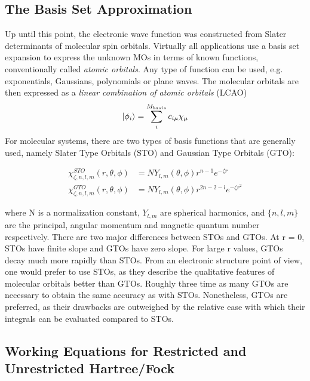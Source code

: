 \subsection{The Basis Set Approximation}

Up until this point, the electronic wave function was constructed from Slater determinants of molecular spin orbitals. Virtually all applications use a basis set expansion to express the unknown MOs in terms of known functions, conventionally called \emph{atomic orbitals}. Any type of function can be used, e.g. exponentials, Gaussians, polynomials or plane waves. The molecular orbitals are then expressed as a \emph{linear combination of atomic orbitals} (LCAO)
\begin{equation}
\ket{\phi_i} = \sum_i^{M_{basis}} c_{i\mu} \chi_{\mu} 
\end{equation}
\noindent For molecular systems, there are two types of basis functions that are generally used, namely Slater Type Orbitals (STO) and Gaussian Type Orbitals (GTO):

\begin{align}
\chi_{\zeta, n, l, m}^{STO} (r,\theta ,\phi ) &= N Y_{l,m} (\theta , \phi ) r^{n-1} e^{-\zeta r}
\\
\chi_{\zeta, n, l, m}^{GTO} (r,\theta ,\phi ) &= N Y_{l,m} (\theta , \phi ) r^{2n - 2 - l} e^{-\zeta r^2}
\end{align}

\noindent where N is a normalization constant, $Y_{l,m}$ are spherical harmonics, and $\{n,l,m\}$ are the principal, angular momentum and magnetic quantum number respectively. There are two major differences between STOs and GTOs. At r = 0, STOs have finite slope and GTOs have zero slope. For large r values, GTOs decay much more rapidly than STOs. From an electronic structure point of view, one would prefer to use STOs, as they describe the qualitative features of molecular orbitals better than GTOs. Roughly three time as many GTOs are necessary to obtain the same accuracy as with STOs. Nonetheless, GTOs are preferred, as their drawbacks are outweighed by the relative ease with which their integrals can be evaluated compared to STOs.

\subsection{Working Equations for Restricted and Unrestricted Hartree\-/Fock}

